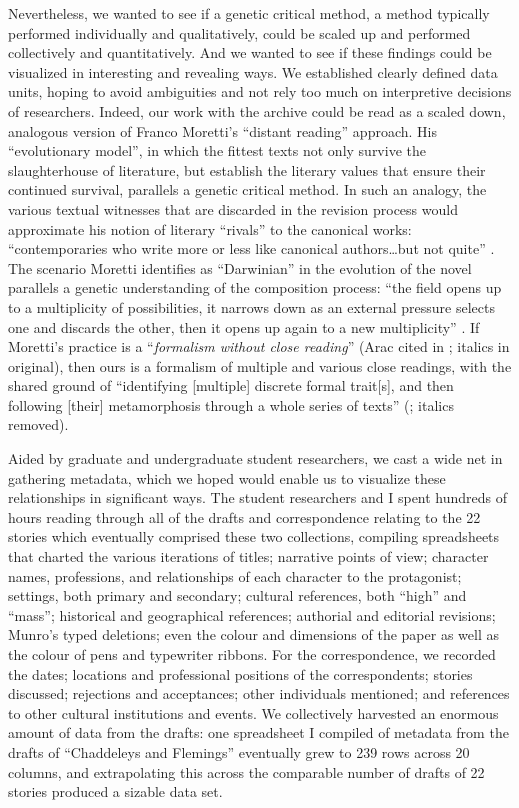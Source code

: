 \documentclass{article}
\begin{document}
Nevertheless, we wanted to see if a genetic critical method, a method
typically performed individually and qualitatively, could be scaled up
and performed collectively and quantitatively. And we wanted to see if
these findings could be visualized in interesting and revealing ways. We
established clearly defined data units, hoping to avoid ambiguities and
not rely too much on interpretive decisions of researchers. Indeed, our
work with the archive could be read as a scaled down, analogous version
of Franco Moretti's ``distant reading'' approach. His ``evolutionary
model'', in which the fittest texts not only survive the slaughterhouse
of literature, but establish the literary values that ensure their
continued survival, parallels a genetic critical method. In such an
analogy, the various textual witnesses that are discarded in the
revision process would approximate his notion of literary ``rivals'' to
the canonical works: ``contemporaries who write more or less like
canonical authors\ldots but not quite'' \citep[66--67]{moretti_distant_2013}. The scenario
Moretti identifies as ``Darwinian'' in the evolution of the novel
parallels a genetic understanding of the composition process: ``the
field opens up to a multiplicity of possibilities, it narrows down as an
external pressure selects one and discards the other, then it opens up
again to a new multiplicity'' \citep[264]{moretti_signs_1983}. If Moretti's practice
is a ``\emph{formalism without close reading}'' (Arac cited in \cite[65]{moretti_distant_2013}; italics in original), then ours is a formalism of multiple and
various close readings, with the shared ground of ``identifying
{[}multiple{]} discrete formal trait{[}s{]}, and then following
{[}their{]} metamorphosis through a whole series of texts'' (\cite[65]{moretti_distant_2013}; italics
removed).

Aided by graduate and undergraduate student researchers, we cast a wide
net in gathering metadata, which we hoped would enable us to visualize
these relationships in significant ways. The student researchers and I
spent hundreds of hours reading through all of the drafts and
correspondence relating to the 22 stories which eventually comprised
these two collections, compiling spreadsheets that charted the various
iterations of titles; narrative points of view; character names,
professions, and relationships of each character to the protagonist;
settings, both primary and secondary; cultural references, both ``high''
and ``mass''; historical and geographical references; authorial and
editorial revisions; Munro's typed deletions; even the colour and
dimensions of the paper as well as the colour of pens and typewriter
ribbons. For the correspondence, we recorded the dates; locations and
professional positions of the correspondents; stories discussed;
rejections and acceptances; other individuals mentioned; and references
to other cultural institutions and events. We collectively harvested an
enormous amount of data from the drafts: one spreadsheet I compiled of
metadata from the drafts of ``Chaddeleys and Flemings'' eventually grew
to 239 rows across 20 columns, and extrapolating this across the
comparable number of drafts of 22 stories produced a sizable data set.
\end{document}

